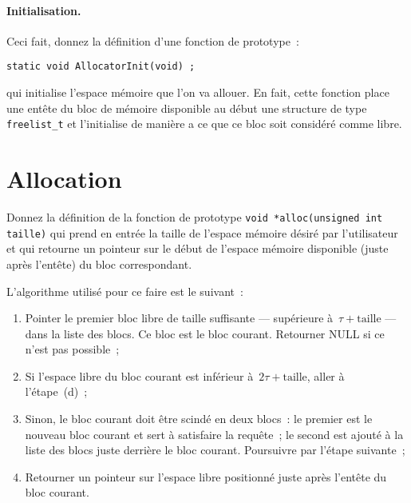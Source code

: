 \documentclass[a4paper]{article}
\begin{document}
\paragraph{Initialisation.}
Ceci fait, 
 donnez la d\'efinition d'une fonction de prototype~:
\begin{verbatim}
static void AllocatorInit(void) ;
\end{verbatim}
  qui initialise l'espace m\'emoire que l'on va allouer.  En fait,
  cette fonction place une ent\^ete du bloc de m\'emoire disponible au
  d\'ebut une structure de type \texttt{freelist\_t} et l'initialise
  de mani\`ere a ce que ce bloc soit consid\'er\'e comme libre.


\section{Allocation}
 Donnez la d\'efinition de la fonction de prototype %
  \verb+void *alloc(unsigned int taille)+ qui prend en entr\'ee la
  taille de l'espace m\'emoire d\'esir\'e par l'utilisateur et qui
  retourne un pointeur sur le d\'ebut de l'espace m\'emoire disponible
  (juste apr\`es l'ent\^ete) du bloc correspondant.
  \par
  L'algorithme utilis\'e pour ce faire est le suivant~:
  \begin{enumerate}
  \item Pointer le premier bloc libre de taille suffisante ---
    sup\'erieure \`a~${\tau+\mathrm{taille}}$ --- dans la liste des
    blocs. Ce bloc est le bloc courant. Retourner NULL si ce n'est pas
    possible~;
  \item Si l'espace libre du bloc courant est inf\'erieur
    \`a~${2\tau+\mathrm{taille}}$, aller \`a l'\'etape~(d)~;
  \item Sinon, le bloc courant doit \^etre scind\'e en deux blocs~: le
    premier est le nouveau bloc courant et sert \`a satisfaire la
    requ\^ete~; le second est ajout\'e \`a la liste des blocs juste
    derri\`ere le bloc courant.  Poursuivre par l'\'etape suivante~;
  \item Retourner un pointeur sur l'espace libre positionn\'e juste
    apr\`es l'ent\^ete du bloc courant.
  \end{enumerate}
\end{document}
